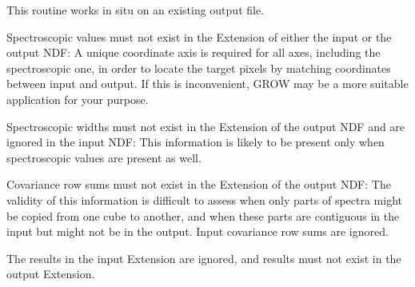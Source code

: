 {{      This routine works in situ on an existing output file.

      Spectroscopic values must not exist in the Extension of either
      the input or the output NDF: A unique coordinate axis is
      required for all axes, including the spectroscopic one, in
      order to locate the target pixels by matching coordinates
      between input and output. If this is inconvenient, GROW may be
      a more suitable application for your purpose.

      Spectroscopic widths must not exist in the Extension of the
      output NDF and are ignored in the input NDF: This information
      is likely to be present only when spectroscopic values are
      present as well.

      Covariance row sums must not exist in the Extension of the
      output NDF: The validity of this information is difficult to
      assess when only parts of spectra might be copied from one cube
      to another, and when these parts are contiguous in the input
      but might not be in the output. Input covariance row sums are
      ignored.

      The results in the input Extension are ignored, and results
      must not exist in the output Extension.
   }
}
\goodbreak
